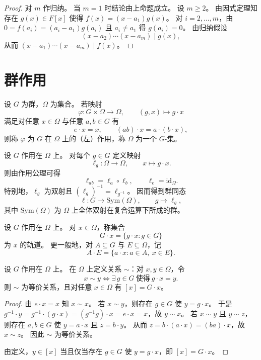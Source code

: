 \documentclass[lang=cn,a4paper,newtx]{elegantbook}
\begin{document}
\begin{proof}
  对 $m$ 作归纳。
  当 $m=1$ 时结论由上命题成立。
  设 $m\ge 2$。
  由因式定理知存在 $g(x)\in F[x]$ 使得 $f(x)=(x-a_1)g(x)$。
  对 $i=2,\dots,m$，由 $0=f(a_i)=(a_i-a_1)g(a_i)$ 且 $a_i\ne a_1$ 得 $g(a_i)=0$。
  由归纳假设
  \[
    (x-a_2)\cdots(x-a_m)\mid g(x),
  \]
  从而 $(x-a_1)\cdots(x-a_m)\mid f(x)$。
\end{proof}

\section{群作用}

\begin{definition}[群作用]
  设 $G$ 为群，$\Omega$ 为集合。
  若映射
  \[
    \varphi:G\times\Omega\to\Omega,\qquad (g,x)\mapsto g\cdot x
  \]
  满足对任意 $x\in\Omega$ 与任意 $a,b\in G$ 有
  \[
    e\cdot x=x,\qquad (ab)\cdot x=a\cdot (b\cdot x),
  \]
  则称 $\varphi$ 为 $G$ 在 $\Omega$ 上的（左）作用，称 $\Omega$ 为一个 $G$-集。
\end{definition}

\begin{remark}
  设 $G$ 作用在 $\Omega$ 上。
  对每个 $g\in G$ 定义映射
  \[
    \ell_g:\Omega\to\Omega,\qquad x\mapsto g\cdot x.
  \]
  则由作用公理可得
  \[
    \ell_{ab}=\ell_a\circ\ell_b,\qquad \ell_e=\mathrm{id}_{\Omega}.
  \]
  特别地，$\ell_g$ 为双射且 $(\ell_g)^{-1}=\ell_{g^{-1}}$。
  因而得到群同态
  \[
    \ell:G\to\mathrm{Sym}(\Omega),\qquad g\mapsto \ell_g,
  \]
  其中 $\mathrm{Sym}(\Omega)$ 为 $\Omega$ 上全体双射在复合运算下所成的群。
\end{remark}

\begin{definition}[轨道]
  设 $G$ 作用在 $\Omega$ 上。
  对 $x\in\Omega$，称集合
  \[
    G\cdot x=\{g\cdot x:g\in G\}
  \]
  为 $x$ 的轨道。
  更一般地，对 $A\subseteq G$ 与 $E\subseteq\Omega$，记
  \[
    A\cdot E=\{a\cdot x:a\in A,\ x\in E\}.
  \]
\end{definition}

\begin{proposition}\label{orbit-equiv-class}
  设 $G$ 作用在 $\Omega$ 上。
  在 $\Omega$ 上定义关系 $\sim$：对 $x,y\in\Omega$，令
  \[
    x\sim y\iff \exists\, g\in G\ \text{使得}\ g\cdot x=y.
  \]
  则 $\sim$ 为等价关系，且对任意 $x\in\Omega$ 有 $[x]=G\cdot x$。
\end{proposition}

\begin{proof}
  由 $e\cdot x=x$ 知 $x\sim x$。
  若 $x\sim y$，则存在 $g\in G$ 使 $y=g\cdot x$。
  于是 $g^{-1}\cdot y=g^{-1}\cdot(g\cdot x)=(g^{-1}g)\cdot x=e\cdot x=x$，故 $y\sim x$。
  若 $x\sim y$ 且 $y\sim z$，则存在 $a,b\in G$ 使 $y=a\cdot x$ 且 $z=b\cdot y$。
  从而 $z=b\cdot(a\cdot x)=(ba)\cdot x$，故 $x\sim z$。
  因此 $\sim$ 为等价关系。

  由定义，$y\in [x]$ 当且仅当存在 $g\in G$ 使 $y=g\cdot x$，即 $[x]=G\cdot x$。
\end{proof}
\end{document}
